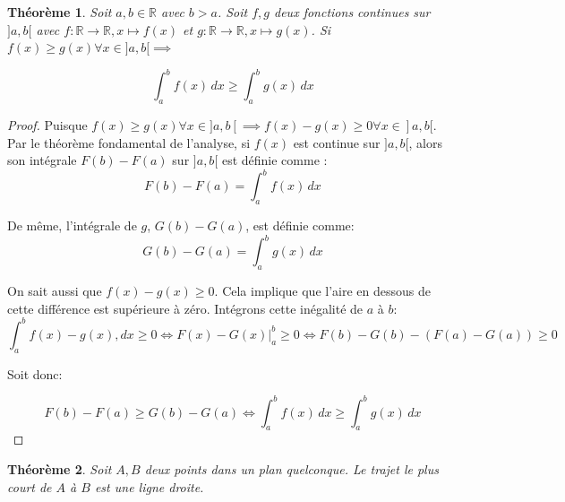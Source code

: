 \documentclass{amsart}
\newtheorem{theorem}{Théorème}[section]
\theoremstyle{definition}
\theoremstyle{remark}
\numberwithin{equation}{section}
\begin{document}
\begin{theorem}
  Soit $a,b\in\mathbb{R}$ avec $b>a$. Soit $f,g$ deux fonctions continues sur $]a,b[$ avec $f:\mathbb{R}\longrightarrow \mathbb{R}, x\longmapsto f(x)$ et $g:\mathbb{R}\longrightarrow \mathbb{R}, x\longmapsto g(x)$. Si $f(x)\geq g(x) \forall x\in]a,b[\implies$

  \[\int_{a}^{b}f(x) \,dx \geq \int_{a}^{b}g(x) \,dx\]
\end{theorem}

\begin{proof}
  Puisque $f(x)\geq g(x) \forall x\in]a,b[ \implies f(x)-g(x)\geq 0\forall x\in]a,b[ $. Par le théorème fondamental de l’analyse, si $f(x)$ est continue sur $]a,b[$, alors son intégrale $F(b)-F(a)$ sur $]a,b[$ est définie comme :
  \[F(b)-F(a) = \int_{a}^{b} f(x) \,dx\]

  De même, l'intégrale de $g$, $G(b)-G(a)$, est définie comme: \[G(b)-G(a) = \int_{a}^{b} g(x) \,dx\]

  On sait aussi que $f(x)-g(x)\geq0$. Cela implique que l'aire en dessous de cette différence est supérieure à zéro. Intégrons cette inégalité de $a$ à $b$: \[\int_{a}^{b} f(x) - g(x), dx \geq 0 \Leftrightarrow F(x)-G(x) \Biggr|_{a}^{b}\geq0 \Leftrightarrow F(b)-G(b) -(F(a)-G(a)) \geq 0 \]

  Soit donc:

  \[F(b)-F(a) \geq G(b)-G(a) \Leftrightarrow \int_{a}^{b}f(x) \,dx \geq \int_{a}^{b}g(x) \,dx\]
\end{proof}

\begin{theorem}
  Soit $A,B$ deux points dans un plan quelconque. Le trajet le plus court de $A$ à $B$ est une ligne droite.
\end{theorem}
\end{document}
